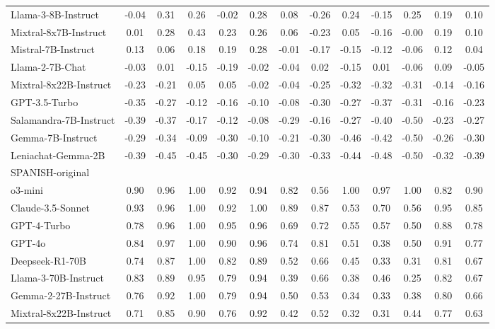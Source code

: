 \begin{table*}[ht]
{\begin{tabular}{lcccccccccccc}
Llama-3-8B-Instruct & -0.04 & 0.31 & 0.26 & -0.02 & 0.28 & 0.08 & -0.26 & 0.24 & -0.15 & 0.25 & 0.19 & 0.10 \\
Mixtral-8x7B-Instruct & 0.01 & 0.28 & 0.43 & 0.23 & 0.26 & 0.06 & -0.23 & 0.05 & -0.16 & -0.00 & 0.19 & 0.10 \\
Mistral-7B-Instruct & 0.13 & 0.06 & 0.18 & 0.19 & 0.28 & -0.01 & -0.17 & -0.15 & -0.12 & -0.06 & 0.12 & 0.04 \\
Llama-2-7B-Chat & -0.03 & 0.01 & -0.15 & -0.19 & -0.02 & -0.04 & 0.02 & -0.15 & 0.01 & -0.06 & 0.09 & -0.05 \\
Mixtral-8x22B-Instruct & -0.23 & -0.21 & 0.05 & 0.05 & -0.02 & -0.04 & -0.25 & -0.32 & -0.32 & -0.31 & -0.14 & -0.16 \\
GPT-3.5-Turbo & -0.35 & -0.27 & -0.12 & -0.16 & -0.10 & -0.08 & -0.30 & -0.27 & -0.37 & -0.31 & -0.16 & -0.23 \\
Salamandra-7B-Instruct & -0.39 & -0.37 & -0.17 & -0.12 & -0.08 & -0.29 & -0.16 & -0.27 & -0.40 & -0.50 & -0.23 & -0.27 \\
Gemma-7B-Instruct & -0.29 & -0.34 & -0.09 & -0.30 & -0.10 & -0.21 & -0.30 & -0.46 & -0.42 & -0.50 & -0.26 & -0.30 \\
Leniachat-Gemma-2B & -0.39 & -0.45 & -0.45 & -0.30 & -0.29 & -0.30 & -0.33 & -0.44 & -0.48 & -0.50 & -0.32 & -0.39 \\
\midrule
SPANISH-original  &&&&&&&&&&&&\\
\midrule
o3-mini & 0.90 & 0.96 & 1.00 & 0.92 & 0.94 & 0.82 & 0.56 & 1.00 & 0.97 & 1.00 & 0.82 & 0.90 \\
Claude-3.5-Sonnet & 0.93 & 0.96 & 1.00 & 0.92 & 1.00 & 0.89 & 0.87 & 0.53 & 0.70 & 0.56 & 0.95 & 0.85 \\
GPT-4-Turbo & 0.78 & 0.96 & 1.00 & 0.95 & 0.96 & 0.69 & 0.72 & 0.55 & 0.57 & 0.50 & 0.88 & 0.78 \\
GPT-4o & 0.84 & 0.97 & 1.00 & 0.90 & 0.96 & 0.74 & 0.81 & 0.51 & 0.38 & 0.50 & 0.91 & 0.77 \\
Deepseek-R1-70B & 0.74 & 0.87 & 1.00 & 0.82 & 0.89 & 0.52 & 0.66 & 0.45 & 0.33 & 0.31 & 0.81 & 0.67 \\
Llama-3-70B-Instruct & 0.83 & 0.89 & 0.95 & 0.79 & 0.94 & 0.39 & 0.66 & 0.38 & 0.46 & 0.25 & 0.82 & 0.67 \\
Gemma-2-27B-Instruct & 0.76 & 0.92 & 1.00 & 0.79 & 0.94 & 0.50 & 0.53 & 0.34 & 0.33 & 0.38 & 0.80 & 0.66 \\
Mixtral-8x22B-Instruct & 0.71 & 0.85 & 0.90 & 0.76 & 0.92 & 0.42 & 0.52 & 0.32 & 0.31 & 0.44 & 0.77 & 0.63 \\

\end{tabular}}
\end{table*}
